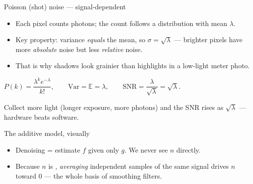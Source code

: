 \documentclass[10pt,aspectratio=169]{beamer}
\begin{document}
\begin{frame}{Poisson (shot) noise — signal-dependent}
  \begin{itemize}
    \item Each pixel counts photons; the count follows a  distribution with mean $\lambda$.
    \item Key property: variance \emph{equals} the mean, so $\sigma=\sqrt{\lambda}$ — brighter pixels have more \emph{absolute} noise but less \emph{relative} noise.
    \item That is why shadows look grainier than highlights in a low-light meter photo.
  \end{itemize}
  \begin{mathbox}
    $P(k)=\dfrac{\lambda^{k}e^{-\lambda}}{k!},\qquad \mathrm{Var}=\mathbb{E}=\lambda,\qquad \text{SNR}=\dfrac{\lambda}{\sqrt{\lambda}}=\sqrt{\lambda}.$
  \end{mathbox}
  \begin{infobox}
    Collect more light (longer exposure, more photons) and the SNR rises as $\sqrt{\lambda}$ — hardware beats software.
  \end{infobox}
\end{frame}

\begin{frame}{The additive model, visually}
  \begin{center}
  \end{center}
  \begin{itemize}
    \item Denoising = estimate $f$ given only $g$. We never see $n$ directly.
    \item Because $n$ is , \emph{averaging} independent samples of the same signal drives $n$ toward $0$ — the whole basis of smoothing filters.
  \end{itemize}
\end{frame}
\end{document}
